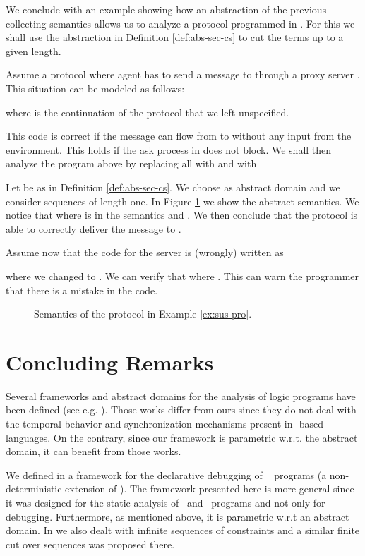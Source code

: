 \documentclass{tlp}
\begin{document}
We conclude with an example showing  how an abstraction of the previous collecting semantics allows us to analyze a protocol programmed in \utcc.  For this we shall use the abstraction in Definition \ref{def:abs-sec-cs} to cut the terms up to a given length. 
\begin{example}\label{ex:sus-pro}
Assume a protocol where agent  
has to send a message to  through a proxy server . This situation can be modeled as follows:


where   is the continuation of the protocol that we left unspecified.

This code is correct if  the message can flow  from  to  without any input from the environment.   
This holds if the ask process in  does not block. We shall then analyze the program above by replacing all    with   and    with 


Let  be as in  Definition  \ref{def:abs-sec-cs}. We choose as abstract domain  and  we  consider sequences of length one. 
In  Figure \ref{fig:sus-sems} we show the abstract semantics.  We notice that  where  is in the semantics  and .  We then conclude that the protocol is able to correctly deliver the message to . 

Assume now that the code for the server is (wrongly) written as 

where we changed  to . 
We can verify that    where 
. This can warn the programmer that there is a mistake in the code. 
\end{example}
\begin{figure}

\caption{Semantics of the protocol in Example \ref{ex:sus-pro}. \label{fig:sus-sems}}
\end{figure}



\section{Concluding Remarks}\label{sec:concluding}



Several frameworks and abstract domains for the analysis of logic programs 
have been defined 
(see e.g. \cite{CC92,Codish99,armstrong98two}). Those works differ from ours since  they do not 
deal with the temporal behavior and synchronization mechanisms present in \tccp-based languages.  
On the contrary,  since our framework is  parametric w.r.t. the abstract domain, it  can benefit from 
those works.

We defined in \cite{FalaschiOPV07} a framework for the declarative debugging of \ntcc\ 
\cite{NPV02} programs (a non-deterministic extension of \tccp). 
The framework presented here is 
more general since it was designed for the static analysis of  
\tccp\ and \utcc\ programs and not 
only for debugging. Furthermore, as mentioned above, it is parametric w.r.t 
an abstract domain. 
In \cite{FalaschiOPV07} we also dealt with infinite sequences of constraints and a similar finite cut over sequences  was proposed there.  
\end{document}
